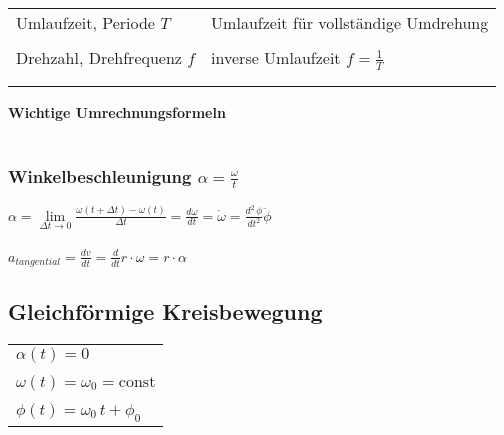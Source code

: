 			\begin{tabular}{ll}
				Umlaufzeit, Periode $T$ & Umlaufzeit für vollständige Umdrehung \\
				\\
				Drehzahl, Drehfrequenz $f$ & inverse Umlaufzeit   $f = \frac{1}{T}$ \\
				\\
				\\
			\end{tabular}
			
			\textbf{Wichtige Umrechnungsformeln} \\		 
				\\

		\subsubsection{Winkelbeschleunigung $\alpha = \frac{\omega}{t}$}
		
			$\alpha = \lim \limits_{\Delta t \rightarrow 0} \frac{\omega(t + \Delta t) - \omega(t)}{\Delta t} = \frac{d \omega}{dt} = \dot{\omega} = \frac{d^2 \, \phi}{d t^2} \ddot{\phi} $ \\
			\\
			$a_{tangential} = \frac{dv}{dt} = \frac{d}{dt} r \cdot \omega = r \cdot \alpha$

	\subsection{Gleichförmige Kreisbewegung}
		
		\begin{tabular}{l}
			$\alpha(t) = 0$ \\
			\\
			$\omega(t) = \omega_0 = \text{const}$ \\
			\\
			$\phi(t) = \omega_0 \, t + \phi_0$ 
		\end{tabular}

